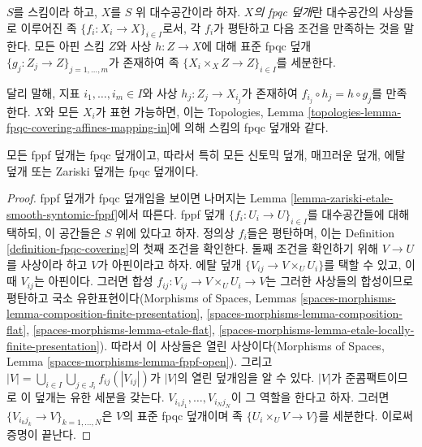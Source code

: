 \begin{definition}
\label{definition-fpqc-covering}
$S$를 스킴이라 하고, $X$를 $S$ 위 대수공간이라 하자. {\it $X$의 fpqc
덮개}란 대수공간의 사상들로 이루어진 족
$\{f_i : X_i \to X\}_{i \in I}$로서, 각 $f_i$가 평탄하고 다음 조건을
만족하는 것을 말한다. 모든 아핀 스킴 $Z$와 사상 $h : Z \to X$에 대해
표준 fpqc 덮개 $\{g_j : Z_j \to Z\}_{j = 1, \ldots, m}$가 존재하여 족
$\{X_i \times_X Z \to Z\}_{i \in I}$를 세분한다.
\end{definition}

\noindent
달리 말해, 지표 $i_1, \ldots, i_m \in I$와 사상
$h_j : Z_j \to X_{i_j}$가 존재하여
$f_{i_j} \circ h_j = h \circ g_j$를 만족한다.
$X$와 모든 $X_i$가 표현 가능하면, 이는 Topologies, Lemma
\ref{topologies-lemma-fpqc-covering-affines-mapping-in}에 의해 스킴의 fpqc
덮개와 같다.

\begin{lemma}
\label{lemma-zariski-etale-smooth-syntomic-fppf-fpqc}
모든 fppf 덮개는 fpqc 덮개이고, 따라서 특히 모든 신토믹 덮개, 매끄러운
덮개, 에탈 덮개 또는 Zariski 덮개는 fpqc 덮개이다.
\end{lemma}

\begin{proof}
fppf 덮개가 fpqc 덮개임을 보이면 나머지는 Lemma
\ref{lemma-zariski-etale-smooth-syntomic-fppf}에서 따른다. fppf 덮개
$\{f_i : U_i \to U\}_{i \in I}$를 대수공간들에 대해 택하되, 이 공간들은
$S$ 위에 있다고 하자. 정의상
$f_i$들은 평탄하며, 이는 Definition \ref{definition-fpqc-covering}의 첫째
조건을 확인한다. 둘째 조건을 확인하기 위해 $V \to U$를 사상이라 하고
$V$가 아핀이라고 하자. 에탈 덮개 $\{V_{ij} \to V \times_U U_i\}$를
택할 수 있고, 이때 $V_{ij}$는 아핀이다. 그러면 합성
$f_{ij} : V_{ij} \to V \times_U U_i \to V$는 그러한 사상들의 합성이므로
평탄하고 국소 유한표현이다(Morphisms of Spaces, Lemmas
\ref{spaces-morphisms-lemma-composition-finite-presentation},
\ref{spaces-morphisms-lemma-composition-flat},
\ref{spaces-morphisms-lemma-etale-flat},
\ref{spaces-morphisms-lemma-etale-locally-finite-presentation}). 따라서 이
사상들은 열린 사상이다(Morphisms of Spaces, Lemma
\ref{spaces-morphisms-lemma-fppf-open}). 그리고
$|V| = \bigcup_{i \in I} \bigcup_{j \in J_i} f_{ij}(|V_{ij}|)$가 $|V|$의
열린 덮개임을 알 수 있다. $|V|$가 준콤팩트이므로 이 덮개는 유한 세분을
갖는다. $V_{i_1j_1}, \ldots, V_{i_Nj_N}$이 그 역할을 한다고 하자. 그러면
$\{V_{i_kj_k} \to V\}_{k = 1, \ldots, N}$은 $V$의 표준 fpqc 덮개이며 족
$\{U_i \times_U V \to V\}$를 세분한다.
이로써 증명이 끝난다.
\end{proof}

